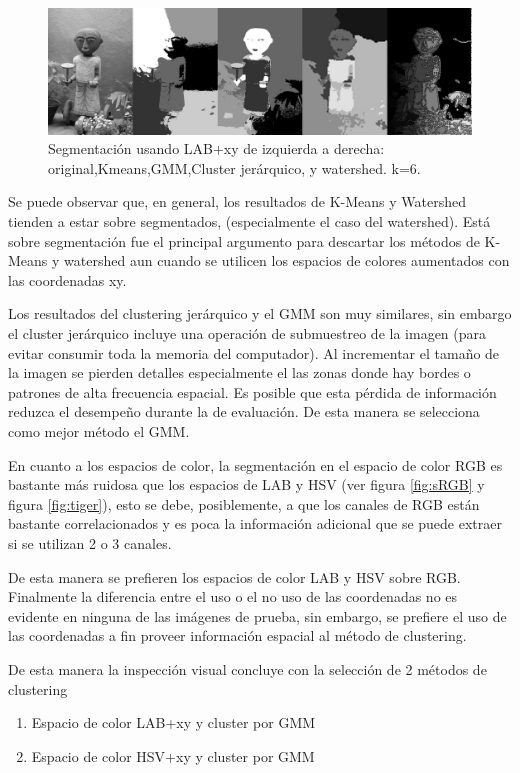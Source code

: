 \documentclass[10pt,twocolumn,letterpaper]{article}
\begin{document}
\begin{figure}
\begin{center}
\includegraphics[width=0.95\linewidth]
                {img/LABXYSample.jpg}
\end{center}
\caption{Segmentación usando LAB+xy de izquierda a derecha: original,Kmeans,GMM,Cluster jerárquico, y watershed. k=6.}
\label{fig:SLABXY}
\end{figure}


Se puede observar que, en general, los resultados de K-Means y Watershed tienden a estar sobre segmentados, (especialmente el caso del watershed). Está sobre segmentación fue el principal argumento para descartar los métodos de K-Means y watershed aun cuando se utilicen los espacios de colores aumentados con las coordenadas xy.

Los resultados del clustering jerárquico y el GMM son muy similares, sin embargo el cluster jerárquico incluye una operación de submuestreo de la imagen (para evitar consumir toda la memoria del computador). Al incrementar el tamaño de la imagen se pierden detalles especialmente el las zonas donde hay bordes o patrones de alta frecuencia espacial. Es posible que esta pérdida de información reduzca el desempeño durante la de evaluación. De esta manera se selecciona como mejor método el GMM.

En cuanto a los espacios de color, la segmentación en el espacio de color RGB es bastante más ruidosa que los espacios de LAB y HSV (ver figura \ref{fig:sRGB} y figura \ref{fig:tiger}), esto se debe, posiblemente, a que los canales de RGB están bastante correlacionados y es poca la información adicional que se puede extraer si se utilizan 2 o 3 canales.

De esta manera se prefieren los espacios de color LAB y HSV sobre RGB. Finalmente la diferencia entre el uso o el no uso de las coordenadas no es evidente en ninguna de las imágenes de prueba, sin embargo, se prefiere el uso de las coordenadas a fin proveer información espacial al método de clustering.


De esta manera la inspección visual concluye con la selección de 2 métodos de clustering
\begin{enumerate}
	\item Espacio de color LAB+xy y cluster por GMM
	\item Espacio de color HSV+xy y cluster por GMM
\end{enumerate}
\end{document}
